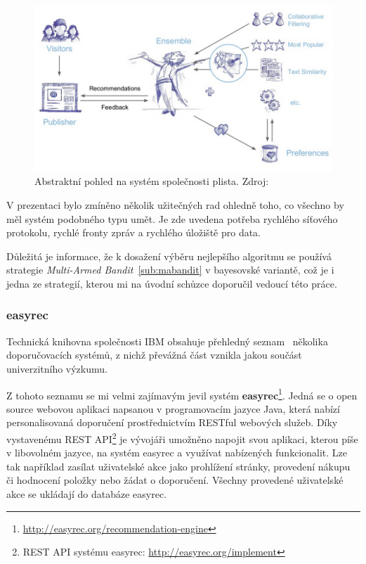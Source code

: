 \documentclass[thesis=M,czech]{FITthesis}[2014/05/07]
\begin{document}
\begin{figure}\centering
	\includegraphics[width=1.0\textwidth]{obr/plistaEnsemble.png}
 	\caption[Abstraktní pohled na systém společnosti plista]{Abstraktní pohled na systém společnosti plista. Zdroj: \cite{slideshare:plista}}\label{fig:plista}
\end{figure}	

V prezentaci bylo zmíněno několik užitečných rad ohledně toho, co všechno by měl systém podobného typu umět. Je zde uvedena potřeba rychlého síťového protokolu, rychlé fronty zpráv a rychlého úložiště pro data.

Důležitá je informace, že k dosažení výběru nejlepšího algoritmu se používá strategie \emph{Multi-Armed Bandit}~\ref{sub:mabandit} v bayesovské variantě, což je i jedna ze strategií, kterou mi na úvodní schůzce doporučil vedoucí této práce.

\subsubsection{easyrec}
Technická knihovna společnosti IBM obsahuje přehledný seznam~\cite{ibm} několika doporučovacích systémů, z nichž převážná část vznikla jakou součást univerzitního výzkumu.

Z tohoto seznamu se mi velmi zajímavým jevil systém \textbf{easyrec}\footnote{\url{http://easyrec.org/recommendation-engine}}. Jedná se o open source webovou aplikaci napsanou v programovacím jazyce Java, která nabízí personalisovaná doporučení prostřednictvím RESTful webových služeb. Díky vystavenému REST API\footnote{REST API systému easyrec: \url{http://easyrec.org/implement}} je vývojáři umožněno napojit svou aplikaci, kterou píše v libovolném jazyce, na systém easyrec a využívat nabízených funkcionalit. Lze tak například zasílat uživatelské akce jako prohlížení stránky, provedení nákupu či hodnocení položky nebo žádat o doporučení. Všechny provedené uživatelské akce se ukládají do databáze easyrec.
\end{document}
